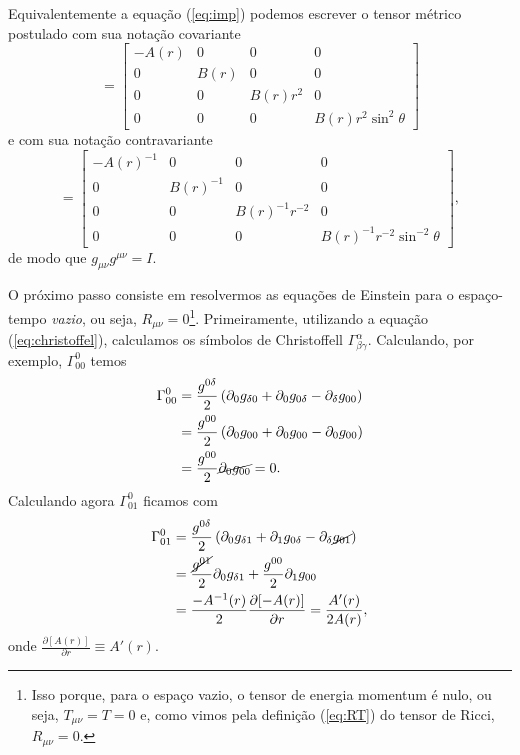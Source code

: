 \documentclass[12pt,a4paper,titlepage,brazil]{article}
\begin{document}
Equivalentemente a equação (\ref{eq:imp}) podemos escrever o tensor métrico postulado com sua notação covariante
\begin{equation}
 [g_{\mu \nu}] = \left[\begin{array}{cccc}
                          - A (r) & 0 & 0 & 0\\
                          0 & B (r) & 0 & 0 \\
                          0 & 0 & B (r) r^2 & 0 \\
                          0 & 0 & 0 & B (r) r^2 \sin^2 \theta
                                      \end{array}\right]  \label{eq:postconv}  
\end{equation}
e com sua notação contravariante
\begin{equation}
 [g^{\mu \nu}] = \left[\begin{array}{cccc}
                          - A (r)^{- 1} & 0 & 0 & 0\\
                          0 & B (r)^{- 1} & 0 & 0 \\
                          0 & 0 & B (r)^{- 1} r^{- 2} & 0 \\
                         0 & 0 & 0 & B (r)^{- 1} r^{- 2} \sin^{- 2} \theta
                                      \end{array}\right] , \label{eq:postcontra}  
\end{equation}
de modo que $g_{\mu \nu} g^{\mu \nu} = I$.

O próximo passo consiste em resolvermos as equações de Einstein para o espaço-tempo \emph{vazio}, ou seja, $R_{\mu \nu} = 0$\footnote{Isso porque, para o espaço vazio, o tensor de energia momentum é nulo, ou seja, $T_{\mu \nu} = T = 0$ e, como vimos pela definição (\ref{eq:RT}) do tensor de Ricci, $R_{\mu \nu} = 0$.}. Primeiramente, utilizando a equação (\ref{eq:christoffel}), calculamos os símbolos de Christoffell $\Gamma^{\alpha}_{\beta \gamma}$. Calculando, por exemplo, $\Gamma^{0}_{0 0}$ temos
\begin{align}
  \Gamma^{0}_{0 0} & = \frac{g^{0 \delta}}{2} \left( \partial_{0} g_{\delta 0} + \partial_{0} g_{0 \delta} - \partial_{\delta} g_{0 0} \right)\\
                   & = \frac{g^{0 0}}{2} \left( \partial_{0} g_{0 0} + \partial_{0} g_{0 0} - \partial_{0} g_{0 0} \right)\\
  & = \frac{g^{0 0}}{2} \cancel{\partial_{0} g_{0 0}} = 0 .
\end{align}
Calculando agora $\Gamma^{0}_{0 1}$ ficamos com
\begin{align}
  \Gamma^{0}_{0 1} & = \frac{g^{0 \delta}}{2} \left( \partial_{0} g_{\delta 1} + \partial_{1} g_{0 \delta} - \partial_{\delta} \cancel{g_{0 1}} \right)\\
                   & = \frac{\cancel{g^{0 1}}}{2} \partial_{0} g_{\delta 1} + \frac{g^{0 0}}{2} \partial_{1} g_{0 0}\\
  & = \frac{- A^{- 1} (r)}{2} \frac{\partial [- A (r)]}{\partial r} = \frac{A' (r)}{2 A (r)} ,
\end{align}
onde $\frac{\partial [A (r)]}{\partial r} \equiv A' (r)$.\\
\end{document}
